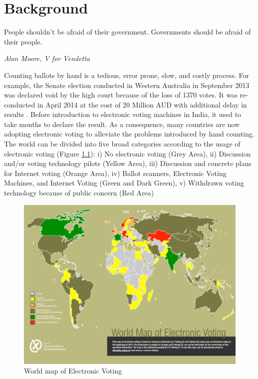 \chapter{Background}
\label{cha:background}
\setlength{\parindent}{2em}
\setlength{\parskip}{1em}

\epigraph{People shouldn't be afraid of their government. Governments should be afraid of their people.} 
{\textit{Alan Moore, V for Vendetta }}
  Counting ballots by hand is a tedious, error prone, slow, and costly process. 
  For example, the Senate election conducted in Western Australia in September 2013 was 
  declared void by the high court because of the loss of 1370 votes. It was 
  re-conducted in April 2014 at the cost of 20 Million 
  AUD with additional  delay in results \citep{Aussentate}. Before introduction to 
  electronic voting machines in India, it used to take months to declare the result.
  As a consequence, many countries 
  are now adopting electronic voting to alleviate the problems introduced by hand counting. 
  The world can be divided into five broad categories according to 
  the usage of electronic voting \citep{Evoting} (Figure \ref{fig:world_electronic_voting_map}): i) No electronic 
  voting (Grey Area), ii)
  Discussion and/or voting technology pilots (Yellow Area), 
  iii) Discussion and concrete plans for Internet voting (Orange Area),
  iv) Ballot scanners, Electronic Voting Machines, and Internet Voting (Green and Dark Green),
  v) Withdrawn voting technology because of public concern (Red Area) 
    \begin{figure}[!htb]
	\begin{center}
	\includegraphics[width=\textwidth,height=\textheight,keepaspectratio]{e-voting_worldmap_2015.pdf}
	\caption{World map of Electronic Voting}
	\label{fig:world_electronic_voting_map}
	\end{center}
  \end{figure}  
 
